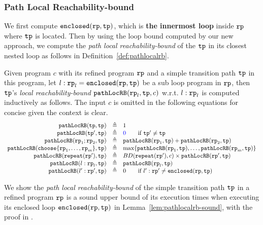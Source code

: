 \subsubsection{Path Local Reachability-bound}
We first compute $\mathtt{enclosed}(\mathtt{rp}, \mathtt{tp})$, which is \textbf{the innermost loop} inside $\mathtt{rp}$ where $\mathtt{tp}$ is located. Then by using the loop bound computed by our new approach, we compute the \emph{path local reachability-bound} of
the $\mathtt{tp}$ in its closest nested loop as follows in Definition~\ref{def:pathlocalrb}.
\begin{defn}
    \label{def:pathlocalrb}
    Given program $c$ with its refined program $\mathtt{rp}$ and a simple transition path $\mathtt{tp}$ in this program, 
    let $l: \mathtt{rp}_l = \mathtt{enclosed}(\mathtt{rp}, \mathtt{tp})$ be a sub loop program in $\mathtt{rp}$,
    then $\mathtt{tp}$'s \emph{local reachability-bound} $\mathtt{pathLocRB}(\mathtt{rp}_l, \mathtt{tp}, c)$ w.r.t. $l: \mathtt{rp}_l$
    is computed inductively as follows.
    The input $c$ is omitted in the following equations for concise given the context is clear.
  \[
    \begin{array}{rcl}
      \outinB(\tpath, \tpath) & \triangleq & 1 \\
      \outinB(\tpath', \tpath) & \triangleq & \highlight{0} \qquad \text{if } \tpath' \neq \tpath\\
      \outinB(\rprog_1;\rprog_2, \tpath) & \triangleq & \outinB(\rprog_1, \tpath) + \outinB(\rprog_2, \tpath) \\
      \outinB(\rpchoose{\rprog_1, \ldots, \rprog_m }, \tpath) & \triangleq 
      & \max\left\{ \outinB(\rprog_1, \tpath), \ldots, \outinB(\rprog_m, \tpath) \right\} \\
      \outinB(\rprepeat(\rprog'), \tpath) & \triangleq 
      & BD(\rprepeat(\rprog'), c) \times \outinB(\rprog', \tpath)
       \\
       \outinB(l: \rprog_l, \tpath) & \triangleq & \outinB(\rprog_l, \tpath) \\
       \outinB(l': \rprog', \tpath) & \triangleq & 0  \qquad \text{if } l': \rprog' \neq \kw{enclosed}(\rprog, \tpath)
    \end{array}
    \]
\end{defn}
We show the \emph{path local reachability-bound} of the simple transition path $\mathtt{tp}$ in a refined program $\mathtt{rp}$ is a sound upper bound of its execution times when executing its enclosed loop $\mathtt{enclosed}(\mathtt{rp}, \mathtt{tp})$ in Lemma~\ref{lem:pathlocalrb-sound}, with the proof in .
